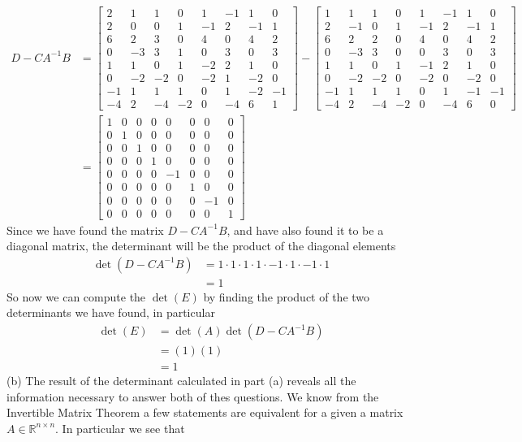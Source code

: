 \documentclass{report}
\begin{document}
$$
\begin{aligned}
D - CA^{-1}B & = 
\begin{bmatrix}
2&1&1&0&1&-1&1&0\\
2&0&0&1&-1&2&-1&1\\
6&2&3&0&4&0&4&2\\
0&-3&3&1&0&3&0&3\\
1&1&0&1&-2&2&1&0\\
0&-2&-2&0&-2&1&-2&0\\
-1&1&1&1&0&1&-2&-1\\
-4&2&-4&-2&0&-4&6&1
\end{bmatrix} -
\begin{bmatrix}
1&1&1&0&1&-1&1&0\\
2&-1&0&1&-1&2&-1&1\\
6&2&2&0&4&0&4&2\\
0&-3&3&0&0&3&0&3\\
1&1&0&1&-1&2&1&0\\
0&-2&-2&0&-2&0&-2&0\\
-1&1&1&1&0&1&-1&-1\\
-4&2&-4&-2&0&-4&6&0
\end{bmatrix} \\
& = \begin{bmatrix}
1&0&0&0&0&0&0&0\\
0&1&0&0&0&0&0&0\\
0&0&1&0&0&0&0&0\\
0&0&0&1&0&0&0&0\\
0&0&0&0&-1&0&0&0\\
0&0&0&0&0&1&0&0\\
0&0&0&0&0&0&-1&0\\
0&0&0&0&0&0&0&1
\end{bmatrix}
\end{aligned}
$$
Since we have found the matrix $D - CA^{-1}B$,  and have also found it to be a diagonal matrix,  the determinant will be the product of the diagonal elements
$$
\begin{aligned}
\det(D - CA^{-1}B) & = 1 \cdot 1 \cdot 1 \cdot 1 \cdot -1 \cdot 1 \cdot -1 \cdot 1 \\
& = 1
\end{aligned}
$$
So now we can compute the $\det(E)$ by finding the product of the two determinants we have found,  in particular
$$
\begin{aligned}
\det(E) & = \det(A)\det(D-CA^{-1}B) \\
& = (1)(1) \\
& = 1
\end{aligned}
$$
(b) The result of the determinant calculated in part (a) reveals all the information necessary to answer both of thes questions.  We know from the Invertible Matrix Theorem a few statements are equivalent for a given a matrix $A\in\mathbb{R}^{n\times n}$.  In particular we see that
\end{document}
